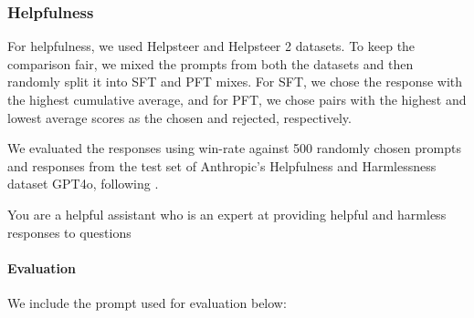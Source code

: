 \subsubsection{Helpfulness}

For helpfulness, we used Helpsteer \citep{wang2023helpsteer} and Helpsteer 2 \citep{wang2024helpsteer2} datasets. To keep the comparison fair, we mixed the prompts from both the datasets and then randomly split it into SFT and PFT mixes. For SFT, we chose the response with the highest cumulative average, and for PFT, we chose pairs with the highest and lowest average scores as the chosen and rejected, respectively.  

We evaluated the responses using win-rate against 500 randomly chosen prompts and responses from the test set of Anthropic's Helpfulness and Harmlessness dataset \cite{bai2022traininghelpfulharmlessassistant} GPT4o, following \citet{rafailov2024direct}. 


\begin{tcolorbox}[breakable, title=System message]
    You are a helpful assistant who is an expert at providing helpful and harmless responses to questions
\end{tcolorbox}


\paragraph{Evaluation} We include the prompt used for evaluation below:


